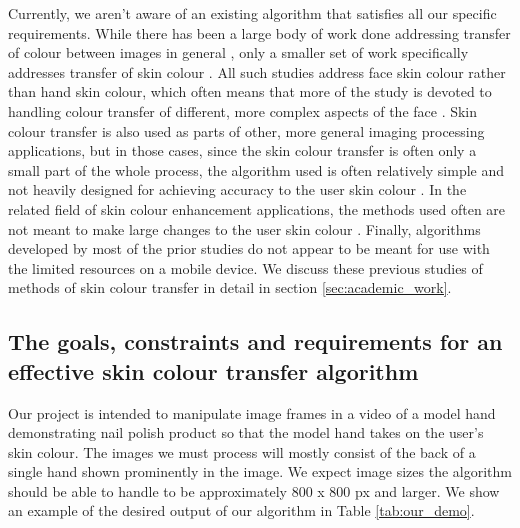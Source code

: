 Currently, we aren't aware of an existing algorithm that satisfies all our specific requirements. While there has been a large body of work done addressing transfer of colour between images in general \cite{reinhard_2001_transfer, pitie_2005_pdf, chen_2014_propagation, chang_2015_palette, zhang_2017_decomposition}, only a smaller set of work specifically addresses transfer of skin colour \cite{yin_2004_transfer, seo_2005_transfer, yang_2017_semantic}. All such studies address face skin colour rather than hand skin colour, which often means that more of the study is devoted to handling colour transfer of different, more complex aspects of the face \cite{yang_2017_semantic}. Skin colour transfer is also used as parts of other, more general imaging processing applications, but in those cases, since the skin colour transfer is often only a small part of the whole process, the algorithm used is often relatively simple and not heavily designed for achieving accuracy to the user skin colour \cite{shilkrot_2013_garment, li_2015_replace}. In the related field of skin colour enhancement applications, the methods used often are not meant to make large changes to the user skin colour \cite{aradhye_2009_enhancement, lee_2010_mobile}. Finally, algorithms developed by most of the prior studies do not appear to be meant for use with the limited resources on a mobile device. We discuss these previous studies of methods of skin colour transfer in detail in section \ref{sec:academic_work}.



\subsection{The goals, constraints and requirements for an effective skin colour transfer algorithm}
Our project is intended to manipulate image frames in a video of a model hand demonstrating nail polish product so that the model hand takes on the user's skin colour. The images we must process will mostly consist of the back of a single hand shown prominently in the image. We expect image sizes the algorithm should be able to handle to be approximately 800 x 800 px and larger. We show an example of the desired output of our algorithm in Table \ref{tab:our_demo}.

